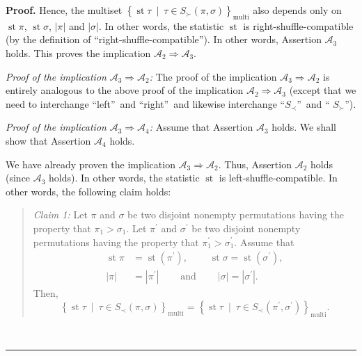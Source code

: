 \documentclass[numbers=enddot,12pt,final,onecolumn,notitlepage]{scrartcl}%
\theoremstyle{definition}
\newenvironment{statement}{\begin{quote}}{\end{quote}}
\newenvironment{proof}[1][Proof]{\noindent\textbf{#1.} }{\ \rule{0.5em}{0.5em}}
\newenvironment{verlong}{}{}
\begin{document}
\begin{verlong}
\begin{proof}
Hence, the multiset $\left\{  \operatorname{st} \tau 
\ \mid\ \tau\in S_{\succ}\left(  \pi,\sigma\right)  \right\}
_{\operatorname*{multi}}$ also depends only on $\operatorname{st} \pi$,
$\operatorname{st} \sigma$,
$\left\vert \pi\right\vert $ and $\left\vert \sigma\right\vert $.
In other words, the
statistic $\operatorname{st}$ is right-shuffle-compatible (by the definition
of \textquotedblleft right-shuffle-compatible\textquotedblright). In other
words, Assertion $\mathcal{A}_{3}$ holds. This proves the implication
$\mathcal{A}_{2}\Longrightarrow\mathcal{A}_{3}$.

\textit{Proof of the implication }$\mathcal{A}_{3}\Longrightarrow
\mathcal{A}_{2}$\textit{:} The proof of the implication $\mathcal{A}%
_{3}\Longrightarrow\mathcal{A}_{2}$ is entirely analogous to the above proof
of the implication $\mathcal{A}_{2}\Longrightarrow\mathcal{A}_{3}$ (except
that we need to interchange \textquotedblleft left\textquotedblright\ and
\textquotedblleft right\textquotedblright\ and likewise interchange
\textquotedblleft$S_{\prec}$\textquotedblright\ and \textquotedblleft%
$S_{\succ}$\textquotedblright).

\textit{Proof of the implication }$\mathcal{A}_{3}\Longrightarrow
\mathcal{A}_{4}$\textit{:} Assume that Assertion $\mathcal{A}_{3}$ holds. We
shall show that Assertion $\mathcal{A}_{4}$ holds.

We have already proven the implication $\mathcal{A}_{3}\Longrightarrow
\mathcal{A}_{2}$. Thus, Assertion $\mathcal{A}_{2}$ holds (since
$\mathcal{A}_{3}$ holds). In other words, the statistic $\operatorname{st}$
is left-shuffle-compatible. In other words, the following claim holds:

\begin{statement}
\textit{Claim 1:} Let $\pi$ and $\sigma$ be two disjoint nonempty permutations
having the property that $\pi_{1}>\sigma_{1}$. Let $\pi^{\prime}$ and
$\sigma^{\prime}$ be two disjoint nonempty permutations having the property
that $\pi_{1}^{\prime}>\sigma_{1}^{\prime}$. Assume that%
\begin{align*}
\operatorname{st} \pi    &  =\operatorname{st}\left(
\pi^{\prime}\right)  ,\ \ \ \ \ \ \ \ \ \ \operatorname{st} \sigma
=\operatorname{st}\left(  \sigma^{\prime}\right)  ,\\
\left\vert \pi\right\vert  &  =\left\vert \pi^{\prime}\right\vert
\ \ \ \ \ \ \ \ \ \ \text{and}\ \ \ \ \ \ \ \ \ \ \left\vert \sigma\right\vert
=\left\vert \sigma^{\prime}\right\vert .
\end{align*}
Then,
\[
\left\{  \operatorname{st} \tau   \ \mid\ \tau\in S_{\prec
}\left(  \pi,\sigma\right)  \right\}  _{\operatorname*{multi}}=\left\{
\operatorname{st} \tau   \ \mid\ \tau\in S_{\prec}\left(
\pi^{\prime},\sigma^{\prime}\right)  \right\}  _{\operatorname*{multi}}.
\]


\end{statement}
\end{proof}
\end{verlong}
\end{document}
